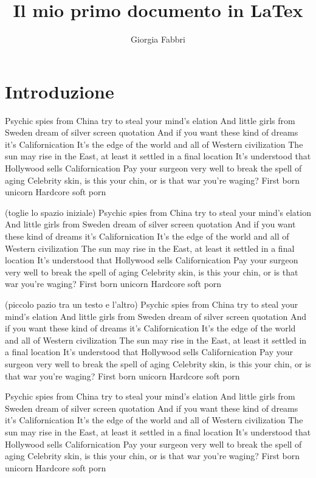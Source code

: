 \documentclass[12pt]{article}
\title{Il mio primo documento in LaTex}
\author{Giorgia Fabbri}
\begin{document}
\maketitle

\tableofcontents
\listoffigures

\section{Introduzione} \label{seq:intro}
Psychic spies from China try to steal your mind's elation
And little girls from Sweden dream of silver screen quotation
And if you want these kind of dreams it's Californication
It's the edge of the world and all of Western civilization
The sun may rise in the East, at least it settled in a final location
It's understood that Hollywood sells Californication
Pay your surgeon very well to break the spell of aging
Celebrity skin, is this your chin, or is that war you're waging?
First born unicorn
Hardcore soft porn

\noindent (toglie lo spazio iniziale) Psychic spies from China try to steal your mind's elation
And little girls from Sweden dream of silver screen quotation
And if you want these kind of dreams it's Californication
It's the edge of the world and all of Western civilization
The sun may rise in the East, at least it settled in a final location
It's understood that Hollywood sells Californication
Pay your surgeon very well to break the spell of aging
Celebrity skin, is this your chin, or is that war you're waging?
First born unicorn
Hardcore soft porn

\smallskip (piccolo pazio tra un testo e l'altro)
Psychic spies from China try to steal your mind's elation
And little girls from Sweden dream of silver screen quotation
And if you want these kind of dreams it's Californication
It's the edge of the world and all of Western civilization
The sun may rise in the East, at least it settled in a final location
It's understood that Hollywood sells Californication
Pay your surgeon very well to break the spell of aging
Celebrity skin, is this your chin, or is that war you're waging?
First born unicorn
Hardcore soft porn

\bigskip
Psychic spies from China try to steal your mind's elation
And little girls from Sweden dream of silver screen quotation
And if you want these kind of dreams it's Californication
It's the edge of the world and all of Western civilization
The sun may rise in the East, at least it settled in a final location
It's understood that Hollywood sells Californication
Pay your surgeon very well to break the spell of aging
Celebrity skin, is this your chin, or is that war you're waging?
First born unicorn
Hardcore soft porn
\end{document}
